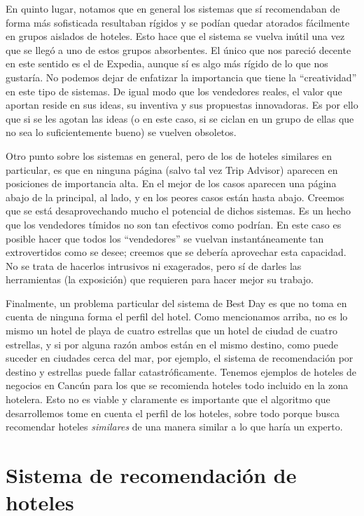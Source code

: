 \documentclass[12pt]{report}
\begin{document}
En quinto lugar, notamos que en general los sistemas que sí recomendaban de forma más sofisticada resultaban rígidos y se podían quedar atorados fácilmente en grupos aislados de hoteles. Esto hace que el sistema se vuelva inútil una vez que se llegó a uno de estos grupos absorbentes. El único que nos pareció decente en este sentido es el de Expedia, aunque sí es algo más rígido de lo que nos gustaría. No podemos dejar de enfatizar la importancia que tiene la ``creatividad'' en este tipo de sistemas. De igual modo que los vendedores reales, el valor que aportan reside en sus ideas, su inventiva y sus propuestas innovadoras. Es por ello que si se les agotan las ideas (o en este caso, si se ciclan en un grupo de ellas que no sea lo suficientemente bueno) se vuelven obsoletos.

Otro punto sobre los sistemas en general, pero de los de hoteles similares en particular, es que en ninguna página (salvo tal vez Trip Advisor) aparecen en posiciones de importancia alta. En el mejor de los casos aparecen una página abajo de la principal, al lado, y en los peores casos están hasta abajo. Creemos que se está desaprovechando mucho el potencial de dichos sistemas. Es un hecho que los vendedores tímidos no son tan efectivos como podrían. En este caso es posible hacer que todos los ``vendedores'' se vuelvan instantáneamente tan extrovertidos como se desee; creemos que se debería aprovechar esta capacidad. No se trata de hacerlos intrusivos ni exagerados, pero sí de darles las herramientas (la exposición) que requieren para hacer mejor su trabajo.

Finalmente, un problema particular del sistema de Best Day es que no toma en cuenta de ninguna forma el perfil del hotel. Como mencionamos arriba, no es lo mismo un hotel de playa de cuatro estrellas que un hotel de ciudad de cuatro estrellas, y si por alguna razón ambos están en el mismo destino, como puede suceder en ciudades cerca del mar, por ejemplo, el sistema de recomendación por destino y estrellas puede fallar catastróficamente. Tenemos ejemplos de hoteles de negocios en Cancún para los que se recomienda hoteles todo incluido en la zona hotelera. Esto no es viable y claramente es importante que el algoritmo que desarrollemos tome en cuenta el perfil de los hoteles, sobre todo porque busca recomendar hoteles \emph{similares} de una manera similar a lo que haría un experto.

\chapter{Sistema de recomendación de hoteles} \label{cap:2}
\end{document}
